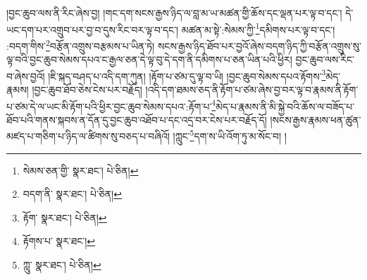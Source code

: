།བྱང་ཆུབ་ལས་ནི་རིང་ཞེས་བྱ། །གང་དག་སངས་རྒྱས་ཉིད་ལ་བླ་མ་ཡ་མཚན་གྱི་ཆོས་དང་ལྡན་པར་ལྟ་བ་དང་། དེ་ཡང་དག་པར་འགྲུབ་པར་བྱ་བ་དུས་རིང་བར་ལྟ་བ་དང་། མཚན་མ་སྟེ་:སེམས་ཀྱི་\footnote{སེམས་ཅན་གྱི་  སྣར་ཐང་།  པེ་ཅིན། }དམིགས་པར་ལྟ་བ་དང་། :བདག་གིས་\footnote{བདག་ནི་  སྣར་ཐང་།  པེ་ཅིན། }བརྩོན་འགྲུས་བརྩམས་པ་ཡིན་ཏེ། སངས་རྒྱས་ཉིད་ཐོབ་པར་བྱའོ་ཞེས་བདག་ཉིད་ཀྱི་བརྩོན་འགྲུས་སུ་ལྟ་བའི་བྱང་ཆུབ་སེམས་དཔའ་ང་རྒྱལ་ཅན་དེ་ལྟ་བུ་དེ་དག་ནི་དམིགས་པ་ཅན་ཡིན་པའི་ཕྱིར། བྱང་ཆུབ་ལས་རིང་བ་ཞེས་བྱའོ། །ཇི་སྐད་བཤད་པ་འདི་དག་ཀུན། །རྟོག་པ་ཙམ་དུ་ལྟ་བ་ཡི། །བྱང་ཆུབ་སེམས་དཔའ་རྟོགས་\footnote{རྟོག་  སྣར་ཐང་།  པེ་ཅིན། }མེད་རྣམས། །བྱང་ཆུབ་ཐོབ་ཅེས་ངེས་པར་བརྗོད། །འདི་དག་ཐམས་ཅད་ནི་རྟོག་པ་ཙམ་ཞེས་བྱ་བར་ལྟ་བ་རྣམས་ནི་རྟོག་པ་ཙམ་དེ་ལ་ཡང་མི་རྟོག་པའི་ཕྱིར་བྱང་ཆུབ་སེམས་དཔའ་:རྟོག་པ་\footnote{རྟོགས་པ་  སྣར་ཐང་། }མེད་པ་རྣམས་ནི་མི་སྐྱེ་བའི་ཆོས་ལ་བཟོད་པ་ཐོབ་པའི་གནས་སྐབས་ན་དོན་དུ་བྱང་ཆུབ་འཐོབ་པ་དང་འདྲ་བར་ངེས་པར་བརྗོད་དོ། །སངས་རྒྱས་རྣམས་ཕན་ཚུན་མཛད་པ་གཅིག་པ་ཉིད་ལ་ཚིགས་སུ་བཅད་པ་བཞིའོ། །ཀླུང་\footnote{ཀླུ་  སྣར་ཐང་།  པེ་ཅིན། }དག་ས་ཡི་འོག་ཏུ་མ་སོང་བ། །
